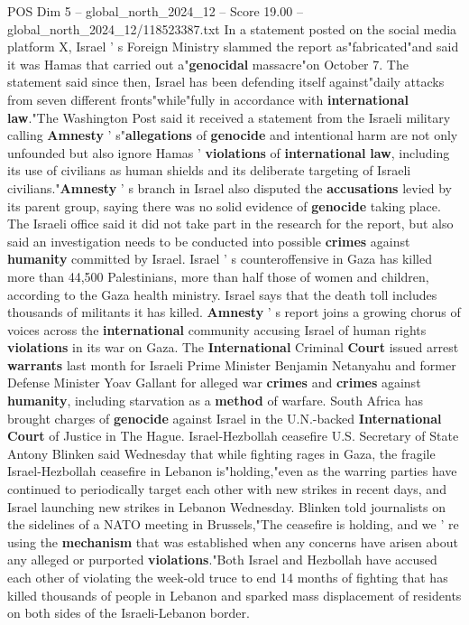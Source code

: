 \begin{textsample}{POS Dim 5 – global\_north\_2024\_12 – Score 19.00 – global\_north\_2024\_12/118523387.txt}
In a statement posted on the social media platform X, Israel ' s Foreign Ministry slammed the report as"fabricated"and said it was Hamas that carried out a"\textbf{genocidal} massacre"on October 7.
The statement said since then, Israel has been defending itself against"daily attacks from seven different fronts"while"fully in accordance with \textbf{international} \textbf{law}."The Washington Post said it received a statement from the Israeli military calling \textbf{Amnesty} ' s"\textbf{allegations} of \textbf{genocide} and intentional harm are not only unfounded but also ignore Hamas ' \textbf{violations} of \textbf{international} \textbf{law}, including its use of civilians as human shields and its deliberate targeting of Israeli civilians."\textbf{Amnesty} ' s branch in Israel also disputed the \textbf{accusations} levied by its parent group, saying there was no solid evidence of \textbf{genocide} taking place.
The Israeli office said it did not take part in the research for the report, but also said an investigation needs to be conducted into possible \textbf{crimes} against \textbf{humanity} committed by Israel.
Israel ' s counteroffensive in Gaza has killed more than 44,500 Palestinians, more than half those of women and children, according to the Gaza health ministry.
Israel says that the death toll includes thousands of militants it has killed. \textbf{Amnesty} ' s report joins a growing chorus of voices across the \textbf{international} community accusing Israel of human rights \textbf{violations} in its war on Gaza.
The \textbf{International} Criminal \textbf{Court} issued arrest \textbf{warrants} last month for Israeli Prime Minister Benjamin Netanyahu and former Defense Minister Yoav Gallant for alleged war \textbf{crimes} and \textbf{crimes} against \textbf{humanity}, including starvation as a \textbf{method} of warfare.
South Africa has brought charges of \textbf{genocide} against Israel in the U.N.-backed \textbf{International} \textbf{Court} of Justice in The Hague.
Israel-Hezbollah ceasefire U.S.
Secretary of State Antony Blinken said Wednesday that while fighting rages in Gaza, the fragile Israel-Hezbollah ceasefire in Lebanon is"holding,"even as the warring parties have continued to periodically target each other with new strikes in recent days, and Israel launching new strikes in Lebanon Wednesday.
Blinken told journalists on the sidelines of a NATO meeting in Brussels,"The ceasefire is holding, and we ' re using the \textbf{mechanism} that was established when any concerns have arisen about any alleged or purported \textbf{violations}."Both Israel and Hezbollah have accused each other of violating the week-old truce to end 14 months of fighting that has killed thousands of people in Lebanon and sparked mass displacement of residents on both sides of the Israeli-Lebanon border.

\end{textsample}
